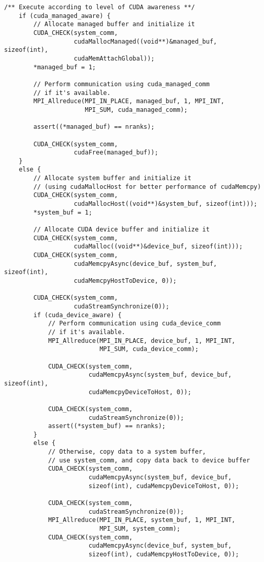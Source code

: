 \begin{example}
\begin{lstlisting}[language={[MPI]C}]
    /** Execute according to level of CUDA awareness **/
    if (cuda_managed_aware) {
        // Allocate managed buffer and initialize it
        CUDA_CHECK(system_comm,
                   cudaMallocManaged((void**)&managed_buf, sizeof(int),
                   cudaMemAttachGlobal));
        *managed_buf = 1;

        // Perform communication using cuda_managed_comm
        // if it's available.
        MPI_Allreduce(MPI_IN_PLACE, managed_buf, 1, MPI_INT,
                      MPI_SUM, cuda_managed_comm);

        assert((*managed_buf) == nranks);

        CUDA_CHECK(system_comm,
                   cudaFree(managed_buf));
    }
    else {
        // Allocate system buffer and initialize it
        // (using cudaMallocHost for better performance of cudaMemcpy)
        CUDA_CHECK(system_comm,
                   cudaMallocHost((void**)&system_buf, sizeof(int)));
        *system_buf = 1;

        // Allocate CUDA device buffer and initialize it
        CUDA_CHECK(system_comm,
                   cudaMalloc((void**)&device_buf, sizeof(int)));
        CUDA_CHECK(system_comm,
                   cudaMemcpyAsync(device_buf, system_buf, sizeof(int),
                   cudaMemcpyHostToDevice, 0));

        CUDA_CHECK(system_comm,
                   cudaStreamSynchronize(0));
        if (cuda_device_aware) {
            // Perform communication using cuda_device_comm
            // if it's available.
            MPI_Allreduce(MPI_IN_PLACE, device_buf, 1, MPI_INT,
                          MPI_SUM, cuda_device_comm);

            CUDA_CHECK(system_comm,
                       cudaMemcpyAsync(system_buf, device_buf, sizeof(int),
                       cudaMemcpyDeviceToHost, 0));

            CUDA_CHECK(system_comm,
                       cudaStreamSynchronize(0));
            assert((*system_buf) == nranks);
        }
        else {
            // Otherwise, copy data to a system buffer,
            // use system_comm, and copy data back to device buffer
            CUDA_CHECK(system_comm,
                       cudaMemcpyAsync(system_buf, device_buf,
                       sizeof(int), cudaMemcpyDeviceToHost, 0));

            CUDA_CHECK(system_comm,
                       cudaStreamSynchronize(0));
            MPI_Allreduce(MPI_IN_PLACE, system_buf, 1, MPI_INT,
                          MPI_SUM, system_comm);
            CUDA_CHECK(system_comm,
                       cudaMemcpyAsync(device_buf, system_buf,
                       sizeof(int), cudaMemcpyHostToDevice, 0));


\end{lstlisting}
\end{example}
